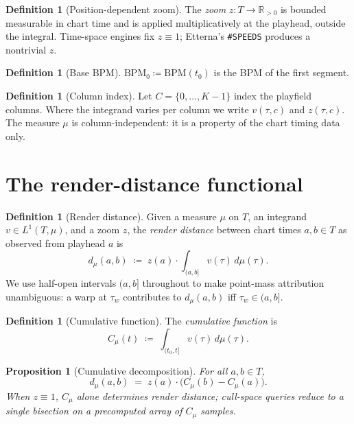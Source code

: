\documentclass[11pt]{article}
\newtheorem{proposition}[theorem]{Proposition}
\theoremstyle{definition}
\newtheorem{definition}[theorem]{Definition}
\newcommand{\R}{\mathbb{R}}
\newcommand{\Rpos}{\R_{>0}}
\newcommand{\bpmz}{\mathrm{BPM}_0}
\newcommand{\bpm}{\mathrm{BPM}}
\newcommand{\dmu}{\,d\mu}
\newcommand{\Lone}{L^{1}}
\begin{document}
\begin{definition}[Position-dependent zoom]
The \emph{zoom} $z : T \to \Rpos$ is bounded measurable in chart time and is
applied multiplicatively at the playhead, outside the integral. Time-space
engines fix $z \equiv 1$; Etterna's \texttt{\#SPEEDS} produces a nontrivial
$z$.
\end{definition}

\begin{definition}[Base BPM]
$\bpmz \coloneqq \bpm(t_0)$ is the BPM of the first segment.
\end{definition}

\begin{definition}[Column index]
Let $C = \{0, \dots, K-1\}$ index the playfield columns. Where the integrand
varies per column we write $v(\tau, c)$ and $z(\tau, c)$. The measure $\mu$ is
column-independent: it is a property of the chart timing data only.
\end{definition}

\section{The render-distance functional}
\label{sec:functional}

\begin{definition}[Render distance]
\label{def:render-distance}
Given a measure $\mu$ on $T$, an integrand $v \in \Lone(T, \mu)$, and a zoom
$z$, the \emph{render distance} between chart times $a, b \in T$ as observed
from playhead $a$ is
\begin{equation}
\label{eq:d}
d_\mu(a, b) \;\coloneqq\; z(a) \cdot \int_{(a, b]} v(\tau)\dmu(\tau).
\end{equation}
We use half-open intervals $(a, b]$ throughout to make point-mass attribution
unambiguous: a warp at $\tau_w$ contributes to $d_\mu(a, b)$ iff $\tau_w \in
(a, b]$.
\end{definition}

\begin{definition}[Cumulative function]
\label{def:cumulative}
The \emph{cumulative function} is
\begin{equation}
\label{eq:C}
C_\mu(t) \;\coloneqq\; \int_{(t_0, t]} v(\tau)\dmu(\tau).
\end{equation}
\end{definition}

\begin{proposition}[Cumulative decomposition]
\label{prop:decomp}
For all $a, b \in T$,
\[
d_\mu(a, b) \;=\; z(a) \cdot \bigl(C_\mu(b) - C_\mu(a)\bigr).
\]
When $z \equiv 1$, $C_\mu$ alone determines render distance; cull-space queries
reduce to a single bisection on a precomputed array of $C_\mu$ samples.
\end{proposition}
\end{document}
